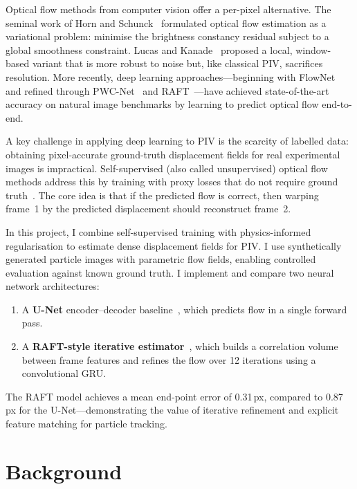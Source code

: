 \documentclass[11pt, a4paper]{article}
\begin{document}
Optical flow methods from computer vision offer a per-pixel alternative.
The seminal work of Horn and Schunck~\cite{horn1981determining} formulated optical flow estimation as a variational problem: minimise the brightness constancy residual subject to a global smoothness constraint.
Lucas and Kanade~\cite{lucas1981iterative} proposed a local, window-based variant that is more robust to noise but, like classical PIV, sacrifices resolution.
More recently, deep learning approaches---beginning with FlowNet~\cite{dosovitskiy2015flownet} and refined through PWC-Net~\cite{sun2018pwcnet} and RAFT~\cite{teed2020raft}---have achieved state-of-the-art accuracy on natural image benchmarks by learning to predict optical flow end-to-end.

A key challenge in applying deep learning to PIV is the scarcity of labelled data: obtaining pixel-accurate ground-truth displacement fields for real experimental images is impractical.
Self-supervised (also called unsupervised) optical flow methods address this by training with proxy losses that do not require ground truth~\cite{jason2016back, meister2018unflow}.
The core idea is that if the predicted flow is correct, then warping frame~1 by the predicted displacement should reconstruct frame~2.

In this project, I combine self-supervised training with physics-informed regularisation to estimate dense displacement fields for PIV.
I use synthetically generated particle images with parametric flow fields, enabling controlled evaluation against known ground truth.
I implement and compare two neural network architectures:
\begin{enumerate}
    \item A \textbf{U-Net} encoder--decoder baseline~\cite{ronneberger2015unet}, which predicts flow in a single forward pass.
    \item A \textbf{RAFT-style iterative estimator}~\cite{teed2020raft}, which builds a correlation volume between frame features and refines the flow over 12 iterations using a convolutional GRU.
\end{enumerate}
The RAFT model achieves a mean end-point error of 0.31\,px, compared to 0.87\,px for the U-Net---demonstrating the value of iterative refinement and explicit feature matching for particle tracking.

\section{Background}
\label{sec:background}
\end{document}
